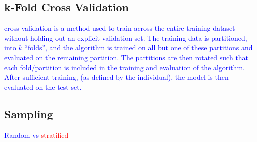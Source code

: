 \subsection{k-Fold Cross Validation}

\textcolor{blue}{cross validation is a method used to train across the entire training dataset without holding out an explicit validation set. The training data is partitioned, into $k$ ``folds'', and the algorithm is trained on all but one of these partitions and evaluated on the remaining partition. The partitions are then rotated such that each fold/partition is included in the training and evaluation of the algorithm. After sufficient training, (as defined by the individual), the model is then evaluated on the test set.}

\subsection{Sampling}

\textcolor{blue}{Random vs \textcolor{red}{stratified}}
